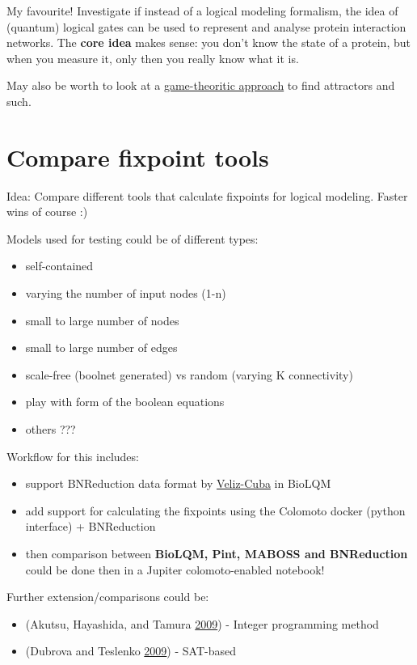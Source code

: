 \documentclass[12pt,]{book}
\providecommand{\tightlist}{%
  \setlength{\itemsep}{0pt}\setlength{\parskip}{0pt}}
\begin{document}
My favourite! Investigate if instead of a logical modeling formalism, the idea
of (quantum) logical gates can be used to represent and analyse protein interaction
networks.
The \textbf{core idea} makes sense: you don't know the state of a protein, but when
you measure it, only then you really know what it is.

May also be worth to look at a \href{https://doi.org/10.1007/11885191_18}{game-theoritic approach}
to find attractors and such.

\hypertarget{comp}{%
\section{Compare fixpoint tools}\label{comp}}

Idea: Compare different tools that calculate fixpoints for logical modeling.
Faster wins of course :)

Models used for testing could be of different types:

\begin{itemize}
\tightlist
\item
  self-contained
\item
  varying the number of input nodes (1-n)
\item
  small to large number of nodes
\item
  small to large number of edges
\item
  scale-free (boolnet generated) vs random (varying K connectivity)
\item
  play with form of the boolean equations
\item
  others ???
\end{itemize}

Workflow for this includes:

\begin{itemize}
\tightlist
\item
  support BNReduction data format by \href{https://doi.org/10.1186/1471-2105-15-221}{Veliz-Cuba}
  in BioLQM
\item
  add support for calculating the fixpoints using the Colomoto docker (python
  interface) + BNReduction
\item
  then comparison between \textbf{BioLQM, Pint, MABOSS and BNReduction} could be done then
  in a Jupiter colomoto-enabled notebook!
\end{itemize}

Further extension/comparisons could be:

\begin{itemize}
\tightlist
\item
  (Akutsu, Hayashida, and Tamura \protect\hyperlink{ref-Akutsu2009}{2009}) - Integer programming method
\item
  (Dubrova and Teslenko \protect\hyperlink{ref-Dubrova2009}{2009}) - SAT-based
\end{itemize}
\end{document}
